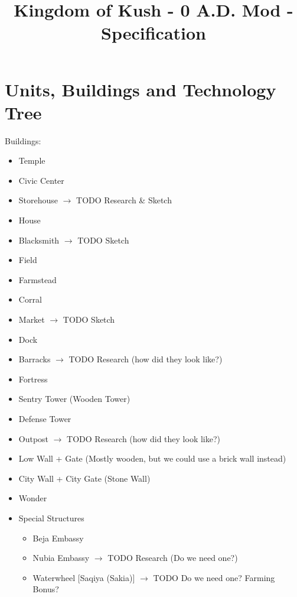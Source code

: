 \documentclass[a4paper,12pt]{scrreprt}
\title{Kingdom of Kush - 0 A.D. Mod - Specification}
\begin{document}
\maketitle


\tableofcontents

\chapter{Units, Buildings and Technology Tree}

Buildings:

\begin{itemize}
	\item Temple
	\item Civic Center
	\item Storehouse $\rightarrow$ TODO Research \& Sketch
	\item House \checkmark
	\item Blacksmith $\rightarrow$ TODO Sketch
	\item Field
	\item Farmstead
	\item Corral
	\item Market $\rightarrow$ TODO Sketch
	\item Dock
	\item Barracks $\rightarrow$ TODO Research (how did they look like?)
	\item Fortress
	\item Sentry Tower (Wooden Tower)
	\item Defense Tower \checkmark
	\item Outpost $\rightarrow$ TODO Research (how did they look like?)
	\item Low Wall + Gate (Mostly wooden, but we could use a brick wall instead)
	\item City Wall + City Gate (Stone Wall)
	\item Wonder
	\item Special Structures
	\begin{itemize}
		\item Beja Embassy  
		
		\item Nubia Embassy $\rightarrow$ TODO Research (Do we need one?)
		\item Waterwheel [Saqiya (Sakia)] $\rightarrow$ TODO Do we need one? Farming Bonus?
	\end{itemize}
\end{itemize}
\end{document}
